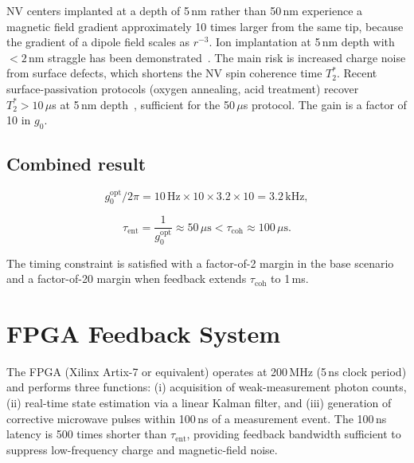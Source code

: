\documentclass[12pt,a4paper]{article}
\begin{document}
NV centers implanted at a depth of 5\,nm rather than 50\,nm experience a
magnetic field gradient approximately 10 times larger from the same tip, because
the gradient of a dipole field scales as $r^{-3}$. Ion implantation at 5\,nm
depth with ${<}2$\,nm straggle has been demonstrated~\cite{Ohno2012}. The main
risk is increased charge noise from surface defects, which shortens the NV spin
coherence time $T_2^*$. Recent surface-passivation protocols (oxygen annealing,
acid treatment) recover $T_2^* > 10\,\mu$s at 5\,nm depth~\cite{DeOliveira2017},
sufficient for the 50\,$\mu$s protocol. The gain is a factor of 10 in $g_0$.

\subsection{Combined result}

\begin{equation}
g_0^{\mathrm{opt}}/2\pi = 10\,\mathrm{Hz} \times 10 \times 3.2 \times 10
= 3.2\,\mathrm{kHz},
\label{eq:g0opt}
\end{equation}

\begin{equation}
\tau_{\mathrm{ent}} = \frac{1}{g_0^{\mathrm{opt}}} \approx 50\,\mu\mathrm{s}
< \tau_{\mathrm{coh}} \approx 100\,\mu\mathrm{s}.
\label{eq:tent}
\end{equation}

The timing constraint is satisfied with a factor-of-2 margin in the base
scenario and a factor-of-20 margin when feedback extends $\tau_{\mathrm{coh}}$
to 1\,ms.

\section{FPGA Feedback System}
\label{sec:fpga}

The FPGA (Xilinx Artix-7 or equivalent) operates at 200\,MHz (5\,ns clock
period) and performs three functions: (i) acquisition of weak-measurement
photon counts, (ii) real-time state estimation via a linear Kalman filter, and
(iii) generation of corrective microwave pulses within 100\,ns of a measurement
event. The 100\,ns latency is 500 times shorter than $\tau_{\mathrm{ent}}$,
providing feedback bandwidth sufficient to suppress low-frequency charge and
magnetic-field noise.

\end{document}
